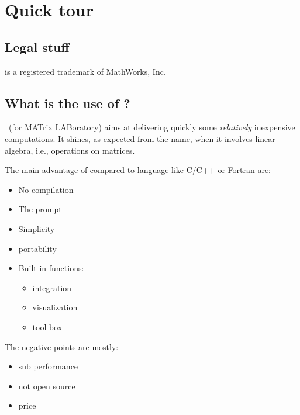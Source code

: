













\chapter{Quick tour \matlab}
\section{Legal stuff}
\matlab is a registered trademark of MathWorks, Inc.

\section{What is the use of \matlab ?}
\matlab~(for MATrix LABoratory) aims at delivering quickly some \emph{relatively} inexpensive computations.
It shines, as expected from the name, when it involves linear algebra, i.e., operations on matrices.

The main advantage of \matlab compared to language like C/C++ or Fortran are:
\begin{itemize}
	\item No compilation
	\item The prompt
	\item Simplicity
	\item portability
	\item Built-in functions:
		\begin{itemize}
			\item integration
			\item visualization
			\item tool-box
		\end{itemize}
\end{itemize}

The negative points are mostly:
\begin{itemize}
	\item sub performance
	\item not open source
	\item {\color{red} price}
\end{itemize}


